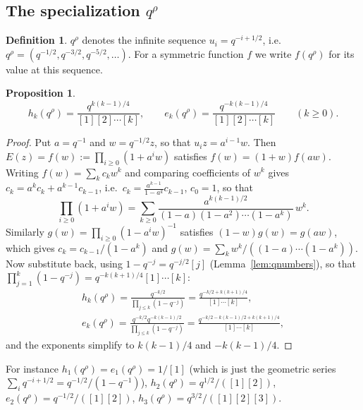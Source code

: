 \documentclass[11pt]{article}
\theoremstyle{plain}
\newtheorem{proposition}[theorem]{Proposition}
\theoremstyle{definition}
\newtheorem{definition}[theorem]{Definition}
\theoremstyle{remark}
\newcommand{\qrho}{q^{\rho}}
\begin{document}
\subsection{The specialization \texorpdfstring{$q^\rho$}{q\textasciicircum rho}}

\begin{definition}
$\qrho$ denotes the infinite sequence $u_i=q^{-i+1/2}$, i.e.\
$\qrho=(q^{-1/2},q^{-3/2},q^{-5/2},\ldots)$. For a symmetric function $f$ we write $f(\qrho)$ for
its value at this sequence.
\end{definition}

\begin{proposition}\label{prop:hrho}
\begin{equation}\label{eq:hrho}
h_k(\qrho)=\frac{q^{k(k-1)/4}}{[1][2]\cdots[k]},\qquad
e_k(\qrho)=\frac{q^{-k(k-1)/4}}{[1][2]\cdots[k]}\qquad(k\ge0).
\end{equation}
\end{proposition}
\begin{proof}
Put $a=q^{-1}$ and $w=q^{-1/2}z$, so that $u_iz=a^{i-1}w$. Then
$E(z)=f(w):=\prod_{i\ge0}(1+a^iw)$ satisfies $f(w)=(1+w)f(aw)$. Writing
$f(w)=\sum_kc_kw^k$ and comparing coefficients of $w^k$ gives $c_k=a^kc_k+a^{k-1}c_{k-1}$, i.e.\
$c_k=\frac{a^{k-1}}{1-a^k}c_{k-1}$, $c_0=1$, so that
\begin{equation}
\prod_{i\ge0}(1+a^iw)=\sum_{k\ge0}\frac{a^{k(k-1)/2}}{(1-a)(1-a^2)\cdots(1-a^k)}\,w^k .
\end{equation}
Similarly $g(w)=\prod_{i\ge0}(1-a^iw)^{-1}$ satisfies $(1-w)g(w)=g(aw)$, which gives
$c_k=c_{k-1}/(1-a^k)$ and $g(w)=\sum_kw^k/((1-a)\cdots(1-a^k))$. Now substitute back, using
$1-q^{-j}=q^{-j/2}[j]$ (Lemma~\ref{lem:qnumbers}), so that $\prod_{j=1}^k(1-q^{-j})=
q^{-k(k+1)/4}[1]\cdots[k]$:
\begin{multline}
h_k(\qrho)=\frac{q^{-k/2}}{\prod_{j\le k}(1-q^{-j})}=\frac{q^{-k/2+k(k+1)/4}}{[1]\cdots[k]},\\
e_k(\qrho)=\frac{q^{-k/2}q^{-k(k-1)/2}}{\prod_{j\le k}(1-q^{-j})}
=\frac{q^{-k/2-k(k-1)/2+k(k+1)/4}}{[1]\cdots[k]},
\end{multline}
and the exponents simplify to $k(k-1)/4$ and $-k(k-1)/4$.
\end{proof}

For instance $h_1(\qrho)=e_1(\qrho)=1/[1]$ (which is just the geometric series
$\sum_iq^{-i+1/2}=q^{-1/2}/(1-q^{-1})$), $h_2(\qrho)=q^{1/2}/([1][2])$,
$e_2(\qrho)=q^{-1/2}/([1][2])$, $h_3(\qrho)=q^{3/2}/([1][2][3])$.
\end{document}
